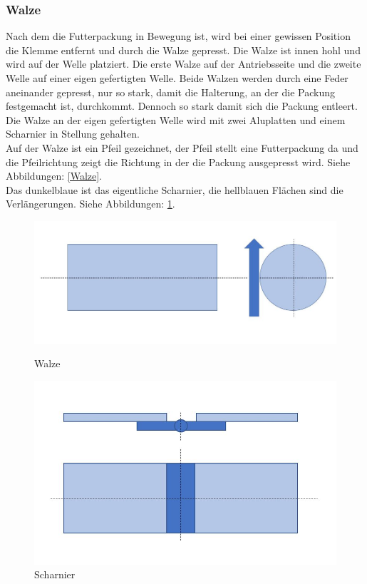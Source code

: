 \subsubsection{Walze}

Nach dem die Futterpackung in Bewegung ist, wird bei einer gewissen Position die Klemme entfernt und durch die Walze gepresst. Die Walze ist innen hohl und wird auf der Welle platziert. Die erste Walze auf der Antriebsseite und die zweite Welle auf einer eigen gefertigten Welle. Beide Walzen werden durch eine Feder aneinander gepresst, nur so stark, damit die Halterung, an der die Packung festgemacht ist, durchkommt. Dennoch so stark damit sich die Packung entleert. Die Walze an der eigen gefertigten Welle wird mit zwei Aluplatten und einem Scharnier in Stellung gehalten.\\ 
Auf der Walze ist ein Pfeil gezeichnet, der Pfeil stellt eine Futterpackung da und die Pfeilrichtung zeigt die Richtung in der die Packung ausgepresst wird. Siehe Abbildungen: \ref{Walze}. \\
Das dunkelblaue ist das eigentliche Scharnier, die hellblauen Flächen sind die Verlängerungen. Siehe Abbildungen: \ref{Scharnier}.

\begin{figure}[H]
   \begin{minipage}[hbt]{.4\linewidth} %
      \includegraphics[width=\linewidth]{Bilder/Powerpoint/Walze}
      \caption{Walze}
      \label{Walze}
   \end{minipage}
   \hspace{.2\linewidth}%
   \begin{minipage}[hbt]{.4\linewidth} %
      \includegraphics[width=\linewidth]{Bilder/Powerpoint/Schanier}
      \caption{Scharnier}
	  \label{Scharnier}      
      \end{minipage}
\end{figure}

